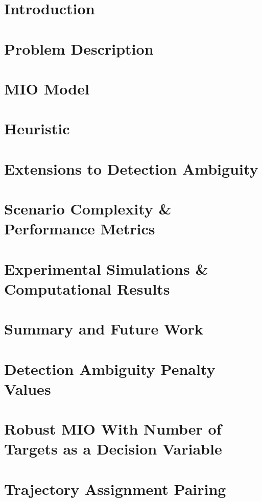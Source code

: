 \documentclass[12pt,twoside,leftblank]{mitthesis}
\begin{document}

\pagestyle{plain}


\chapter{Introduction}\label{ch: Intro}


\chapter{Problem Description}\label{ch:Problem Description}


\chapter{MIO Model}\label{ch:Basic MIO Model}


\chapter{Heuristic}\label{ch:Heuristic}


\chapter{Extensions to Detection Ambiguity}\label{ch:Robust MIO Model}


\chapter{Scenario Complexity \& Performance Metrics} \label{ch:Scenario-Performance}

 
\chapter{Experimental Simulations \& Computational Results}\label{ch:Results}


\chapter{Summary and Future Work}\label{ch:Conclusion}


\appendix

\chapter{Detection Ambiguity Penalty Values}\label{app:Penalty_Appendix}


\chapter{Robust MIO With Number of Targets as a Decision Variable}\label{app:Robust_Appendix}


\chapter{Trajectory Assignment Pairing}\label{app:Assignment_Appendix}



\end{document}
